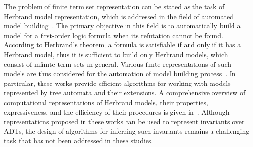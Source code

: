 The problem of finite term set representation can be stated as the task of Herbrand model representation, which is addressed in the field of automated model building~\cite{caferra2013automated}. The primary objective in this field is to automatically build a model for a first-order logic formula when its refutation cannot be found. According to Herbrand's theorem, a formula is satisfiable if and only if it has a Herbrand model, thus it is sufficient to build only Herbrand models, which consist of infinite term sets in general. Various finite representations of such models are thus considered for the automation of model building process~\cite{fermuller2007model,fermuller2005model,teucke2019expressivity,gramlich2002algorithmic}. In particular, these works provide efficient algorithms for working with models represented by tree automata and their extensions. A comprehensive overview of computational representations of Herbrand models, their properties, expressiveness, and the efficiency of their procedures is given in~\cite{matzinger1998computational, matzinger2000computational}. Although representations proposed in these works can be used to represent invariants over ADTs, the design of algorithms for inferring such invariants remains a challenging task that has not been addressed in these studies.


